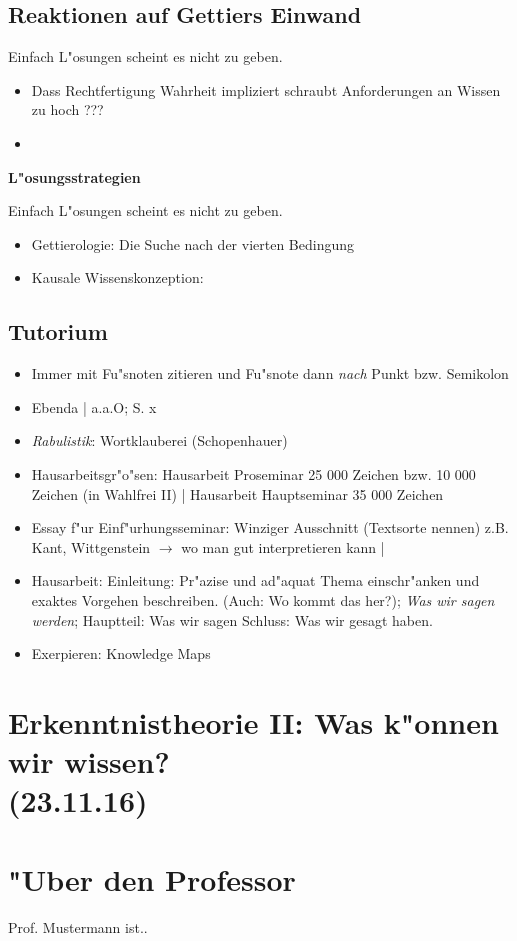\documentclass[emulatestandardclasses]{scrartcl}
\begin{document}
\subsection{Reaktionen auf Gettiers Einwand}

Einfach L"osungen scheint es nicht zu geben.
\begin{itemize}
  \item Dass Rechtfertigung Wahrheit impliziert schraubt Anforderungen an Wissen zu hoch ???
  \item 
\end{itemize}

\textbf{L"osungsstrategien}

Einfach L"osungen scheint es nicht zu geben.
\begin{itemize}
  \item Gettierologie: Die Suche nach der vierten Bedingung
  \item Kausale Wissenskonzeption: 
\end{itemize}


\subsection{Tutorium}

\begin{itemize}
  \item Immer mit Fu"snoten zitieren und Fu"snote dann \emph{nach} Punkt bzw. Semikolon
  \item Ebenda | a.a.O; S. x
  \item \emph{Rabulistik}: Wortklauberei (Schopenhauer)
  \item Hausarbeitsgr"o"sen: Hausarbeit Proseminar 25 000 Zeichen bzw. 10 000 Zeichen (in Wahlfrei II) | Hausarbeit Hauptseminar 35 000 Zeichen
  \item Essay f"ur Einf"urhungsseminar: Winziger Ausschnitt (Textsorte nennen) z.B. Kant, Wittgenstein $\rightarrow$ wo man gut interpretieren kann |
  \item Hausarbeit: Einleitung: Pr"azise und ad"aquat Thema einschr"anken und exaktes Vorgehen beschreiben. (Auch: Wo kommt das her?); \emph{Was wir sagen werden}; Hauptteil: Was wir sagen Schluss: Was wir gesagt haben.
  \item Exerpieren: Knowledge Maps
\end{itemize}








\section{Erkenntnistheorie II: Was k"onnen wir wissen?\\(23.11.16)}

\newpage
\section{"Uber den Professor}
Prof. Mustermann ist..


\end{document}
